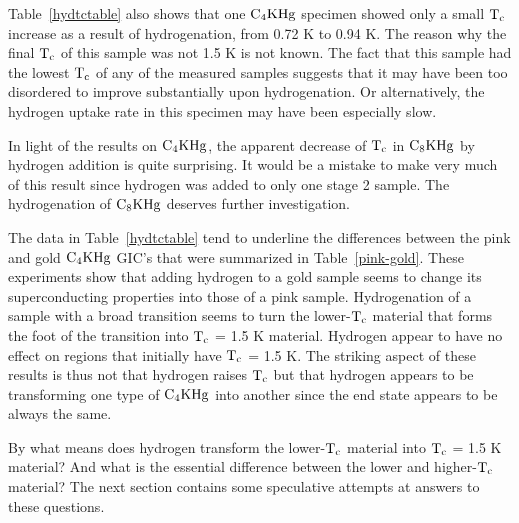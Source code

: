        Table~\ref{hydtctable}  also shows that  one $\rm  C_4KHg$ specimen
showed only a small $\rm T_c$ increase as  a  result of hydrogenation, from
0.72 K to 0.94 K.  The  reason why the  final  $\rm T_c$ of this sample was
not 1.5 K is not known.  The fact that this sample had the lowest $\rm T_c$
of   any  of  the  measured  samples suggests  that  it may  have  been too
disordered to improve substantially upon hydrogenation.   Or alternatively,
the hydrogen uptake  rate in this specimen may have been especially slow.

        In light of the results on $\rm C_4KHg$, the  apparent  decrease of
$\rm T_c$ in $\rm  C_8KHg$ by hydrogen addition   is quite surprising.   It
would be a mistake  to make very much   of this result  since hydrogen  was
added to  only one  stage   2  sample.  The  hydrogenation of  $\rm C_8KHg$
deserves further investigation.

        The  data   in   Table~\ref{hydtctable}   tend  to   underline  the
differences  between the  pink  and gold   $\rm  C_4KHg$  GIC's  that  were
summarized in Table~\ref{pink-gold}.   These  experiments show  that adding
hydrogen to  a gold sample seems to  change its  superconducting properties
into  those of a pink   sample.   Hydrogenation  of  a sample with  a broad
transition seems to turn the lower-$\rm  T_c$ material that forms  the foot
of the transition into $\rm T_c$ = 1.5 K material.  Hydrogen appear to have
no effect on regions that initially have $\rm  T_c$ = 1.5 K.   The striking
aspect of these results is thus not that hydrogen raises $\rm T_c$ but that
hydrogen appears to be transforming  one type of  $\rm C_4KHg$ into another
since the end state appears to be always the same.

        By what means does hydrogen transform the lower-$\rm  T_c$ material
into $\rm  T_c$ = 1.5  K  material?  And what is  the  essential difference
between the lower and higher-$\rm T_c$ material?  The next section contains
some speculative attempts at answers to these questions.
